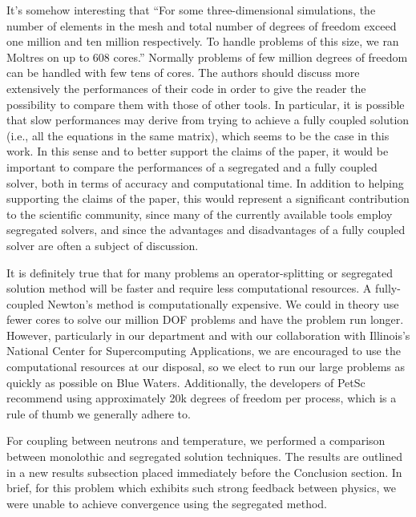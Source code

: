 \documentclass[answers,11pt]{exam}
\begin{document}
\begin{questions}
\question It's somehow interesting that ``For some three-dimensional
simulations, the number of elements in the mesh and total number of degrees of
freedom exceed one million and ten million respectively. To handle problems of
this size, we ran Moltres on up to 608 cores.'' Normally problems of few million
degrees of freedom can be handled with few tens of cores. The authors should
discuss more extensively the performances of their code in order to give the
reader the possibility to compare them with those of other tools. In particular,
it is possible that slow performances may derive from trying to achieve a fully
coupled solution (i.e., all the equations in the same matrix), which seems to be
the case in this work. In this sense and to better support the claims of the
paper, it would be important to compare the performances of a segregated and a
fully coupled solver, both in terms of accuracy and computational time. In
addition to helping supporting the claims of the paper, this would represent a
significant contribution to the scientific community, since many of the
currently available tools employ segregated solvers, and since the advantages
and disadvantages of a fully coupled solver are often a subject of discussion.
\begin{solution}
        It is definitely true that for many problems an operator-splitting or
        segregated solution method will be faster and require less
        computational resources. A fully-coupled Newton's method is
        computationally expensive. We could in theory use fewer cores to solve
        our million DOF problems and have the problem run longer. However,
        particularly in our department and with our collaboration with Illinois's
        National Center for Supercomputing Applications, we are encouraged to
        use the computational resources at our disposal, so we elect to run our
        large problems as quickly as possible on Blue Waters. Additionally, the
        developers of PetSc recommend using approximately 20k degrees of freedom
        per process, which is a rule of thumb we generally adhere to.

        For coupling between neutrons and temperature, we performed a comparison
        between monolothic and segregated solution techniques. The results are
        outlined in a new results subsection placed immediately before the
        Conclusion section. In brief, for this problem which exhibits such strong
        feedback between physics, we were unable to achieve convergence using the
        segregated method.
\end{solution}



\end{questions}
\end{document}
